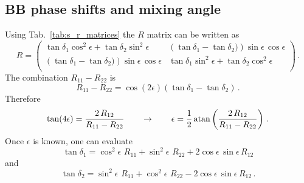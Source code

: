 \documentclass[10pt,a4paper]{article}
\begin{document}
	\subsection{BB phase shifts and mixing angle}
	Using Tab.~\ref{tab:s_r_matrices} the $R$ matrix can be written as
	\begin{equation}
		R= \left(
		\begin{array}{cc}
			\tan \delta_1 \cos ^2 \epsilon +\tan \delta_2 \sin ^2 \epsilon  & 
			\left(\tan\delta_1 -\tan\delta_2)\right) \sin\epsilon\, \cos  \epsilon \\
			\left(\tan\delta_1 -\tan\delta_2)\right) \sin\epsilon\, \cos  \epsilon & 
			\tan \delta_1 \sin ^2
			\epsilon +\tan \delta_2 \cos ^2\epsilon \\
		\end{array}
		\right)\,.
	\end{equation}
	The combination $R_{11}-R_{22}$ is
	\begin{equation}
		R_{11}-R_{22} = 
		\cos(2\epsilon) 
		\left(\tan \delta_1 - \tan \delta_2\right)\,.
	\end{equation}
	Therefore
	\begin{equation}
		\tan(4\epsilon) = \frac{2\,R_{12}}{R_{11}-R_{22}}
		\qquad
		\rightarrow
		\qquad
		\epsilon =
		\frac{1}{2} \atan\left(\frac{2\,R_{12}}{R_{11}-R_{22}}\right)\,.
	\end{equation}
	Once $\epsilon$ is known, one can evaluate 
	\begin{equation}
		\tan\delta_1
		=
		\cos^2 \epsilon \,\,R_{11}
		+\sin^2 \epsilon \,\,R_{22}
		+2 \cos\epsilon \,\sin\epsilon\, R_{12}
	\end{equation}
	and
	\begin{equation}
		\tan\delta_2
		=
		\sin^2 \epsilon\,\,R_{11}
		+\cos^2 \epsilon \,\,R_{22}
		-2 \cos\epsilon\, \sin\epsilon\, R_{12}\,.
	\end{equation}
	
\end{document}
